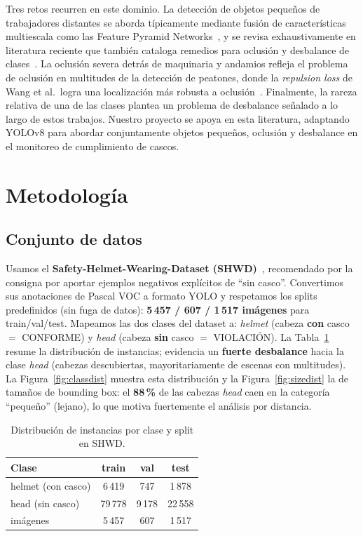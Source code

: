 \documentclass{article}
\begin{document}
Tres retos recurren en este dominio. La detección de objetos pequeños de
trabajadores distantes se aborda típicamente mediante fusión de características
multiescala como las Feature Pyramid Networks~\citep{lin2017fpn}, y se revisa
exhaustivamente en literatura reciente que también cataloga remedios para oclusión
y desbalance de clases~\citep{kang2025sodsurvey}. La oclusión severa detrás de
maquinaria y andamios refleja el problema de oclusión en multitudes de la
detección de peatones, donde la \emph{repulsion loss} de Wang et al.\ logra una
localización más robusta a oclusión~\citep{wang2018repulsion}. Finalmente, la
rareza relativa de una de las clases plantea un problema de desbalance señalado a
lo largo de estos trabajos. Nuestro proyecto se apoya en esta literatura,
adaptando YOLOv8 para abordar conjuntamente objetos pequeños, oclusión y
desbalance en el monitoreo de cumplimiento de cascos.

\section{Metodología}

\subsection{Conjunto de datos}
Usamos el \textbf{Safety-Helmet-Wearing-Dataset (SHWD)}~\citep{njvisionpower2019shwd},
recomendado por la consigna por aportar ejemplos negativos explícitos de ``sin
casco''. Convertimos sus anotaciones de Pascal VOC a formato YOLO y respetamos los
splits predefinidos (sin fuga de datos): \textbf{5\,457 / 607 / 1\,517 imágenes}
para train/val/test. Mapeamos las dos clases del dataset a:
\emph{helmet} (cabeza \textbf{con} casco $=$ CONFORME) y \emph{head} (cabeza
\textbf{sin} casco $=$ VIOLACIÓN). La Tabla~\ref{tab:dataset} resume la
distribución de instancias; evidencia un \textbf{fuerte desbalance} hacia la clase
\emph{head} (cabezas descubiertas, mayoritariamente de escenas con multitudes).
La Figura~\ref{fig:classdist} muestra esta distribución y la
Figura~\ref{fig:sizedist} la de tamaños de bounding box: el \textbf{88\,\%} de las
cabezas \emph{head} caen en la categoría ``pequeño'' (lejano), lo que motiva
fuertemente el análisis por distancia.

\begin{table}[h]
  \centering
  \caption{Distribución de instancias por clase y split en SHWD.}
  \label{tab:dataset}
  \begin{tabular}{lccc}
    \toprule
    Clase & train & val & test \\
    \midrule
    helmet (con casco) & 6\,419 & 747 & 1\,878 \\
    head (sin casco)   & 79\,778 & 9\,178 & 22\,558 \\
    \midrule
    imágenes & 5\,457 & 607 & 1\,517 \\
    \bottomrule
  \end{tabular}
\end{table}
\end{document}
